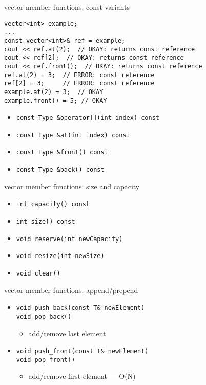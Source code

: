     \begin{frame}[fragile,label=vectMethConst]{vector member functions: const variants}
\lstset{
    language=C++,
    style=small
}
\begin{lstlisting}
vector<int> example;
...
const vector<int>& ref = example;
cout << ref.at(2);  // OKAY: returns const reference
cout << ref[2];  // OKAY: returns const reference
cout << ref.front();  // OKAY: returns const reference
ref.at(2) = 3;  // ERROR: const reference
ref[2] = 3;     // ERROR: const reference
example.at(2) = 3;  // OKAY
example.front() = 5; // OKAY
\end{lstlisting}
\begin{itemize}
\item \lstinline|const Type &operator[](int index) const|
\item \lstinline|const Type &at(int index) const|
\item \lstinline|const Type &front() const|
\item \lstinline|const Type &back() const|
\end{itemize}
\end{frame}

    \begin{frame}[fragile,label=vectMethSize]{vector member functions: size and capacity}
\lstset{
    language=C++,
    style=small
}
\begin{itemize}
\item \lstinline|int capacity() const|
\item \lstinline|int size() const|
\item \lstinline|void reserve(int newCapacity)|
\item \lstinline|void resize(int newSize)|
\item \lstinline|void clear()|
\end{itemize}
\end{frame}


\begin{frame}[fragile,label=vectMethApp]{vector member functions: append/prepend}
\lstset{
    language=C++,
    style=small
}
\begin{itemize}
\item \lstinline|void push_back(const T& newElement)| \\
      \lstinline|void pop_back()|
\begin{itemize}\item add/remove last element\end{itemize}
\item \lstinline|void push_front(const T& newElement)| \\
      \lstinline|void pop_front()|
\begin{itemize}\item add/remove first element --- O(N)\end{itemize}
\end{itemize}
\end{frame}
